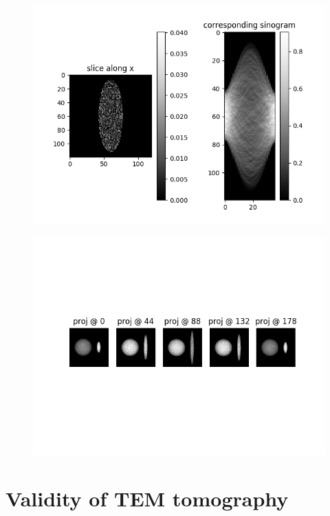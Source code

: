 \documentclass[slidestop,compress,12pt]{beamer}
\begin{document}
\begin{frame}
    \begin{figure}
        \includegraphics[scale=0.5,left]{imgs/sinogram.png}
    \end{figure}\pause
    \vspace{-3cm}
    \begin{figure}
        \includegraphics[scale=0.5,right]{imgs/projections.png}
    \end{figure}
\end{frame}

\section{Validity of TEM tomography}
\end{document}
